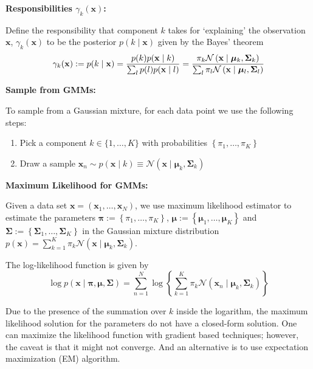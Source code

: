 \documentclass[11pt]{article}
\theoremstyle{plain} %
\newenvironment{topic}
{\color{C2}\normalfont\begin{framed}\begingroup }
  {\endgroup\end{framed}}
\theoremstyle{remark}
\begin{document}
\begin{topic}
\begin{itemize}
  \end{itemize}

  \textbf{Responsibilities $\gamma_{k}(\mathbf{x})$:}

  Define the responsibility that component $k$ takes for `explaining' the
    observation $\mathbf{x}$, $\gamma_{k}(\mathbf{x})$ to be the posterior $p(k
    \mid \mathbf{x})$ given by the Bayes' theorem
  $$
    \gamma_{k}(\mathbf{x}) := p(k \mid \mathbf{x}) =\frac{p(k) p(\mathbf{x} \mid k)}{\sum_{l} p(l) p(\mathbf{x} \mid l)}                                                                                                                                 \\
    =\frac{\pi_{k} \mathcal{N}\left(\mathbf{x} \mid \boldsymbol{\mu}_{k}, \mathbf{\Sigma}_{k}\right)}{\sum_{l} \pi_{l} \mathcal{N}\left(\mathbf{x} \mid \boldsymbol{\mu}_{l}, \mathbf{\Sigma}_{l}\right)}
  $$



  \textbf{Sample from GMMs:}

  To sample from a Gaussian mixture, for each data point we use the following
  steps:

  \begin{enumerate}
    \item Pick a component $k \in\{1, \ldots, K\}$ with probabilities
          $\left\{\pi_{1}, \ldots, \pi_{K}\right\}$

    \item Draw a sample $\mathbf{x}_{n} \sim p(\mathbf{x} \mid k) \equiv \mathcal{N}\left(\mathbf{x} \mid
            \boldsymbol{\mu}_{k}, \boldsymbol{\Sigma}_{k}\right)$
  \end{enumerate}

  \textbf{Maximum Likelihood for GMMs:}

  Given a data set $\mathbf{x}=\left(\mathbf{x}_{1}, \ldots,
    \mathbf{x}_{N}\right)$, we use maximum likelihood estimator to estimate the parameters
  $\boldsymbol{\pi}:=\left\{\pi_{1}, \ldots, \pi_{K}\right\}$, $\boldsymbol{\mu}
    :=\left\{\boldsymbol{\mu}_{1}, \ldots, \boldsymbol{\mu}_{K}\right\}$ and
  $\boldsymbol{\Sigma} :=\left\{\boldsymbol{\Sigma}_{1}, \ldots,
    \boldsymbol{\Sigma}_{K}\right\}$ in the Gaussian mixture distribution
  $p(\mathbf{x})=\sum_{k=1}^{K} \pi_{k} \mathcal{N}\left(\mathbf{x} \mid
    \boldsymbol{\mu}_{k}, \boldsymbol{\Sigma}_{k}\right)$.

  The log-likelihood function is given by
  $$
    \log p(\mathbf{x} \mid \boldsymbol{\pi}, \boldsymbol{\mu}, \boldsymbol{\Sigma})=\sum_{n=1}^{N} \log \left\{\sum_{k=1}^{K} \pi_{k} \mathcal{N}\left(\mathbf{x}_{n} \mid \boldsymbol{\mu}_{k}, \boldsymbol{\Sigma}_{k}\right)\right\}
  $$

  Due to the presence of the summation over $k$ inside the logarithm, the maximum
  likelihood solution for the parameters do not have a closed-form solution.
  One can maximize the likelihood function with gradient based techniques; however, the caveat is
  that it might not converge. And an alternative is to
  use expectation maximization (EM) algorithm.
\end{topic}
\end{document}
